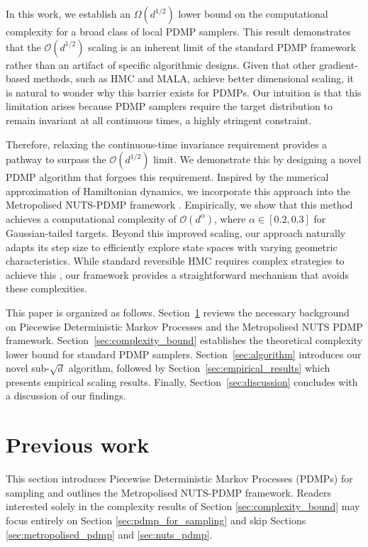 \documentclass{article}
\begin{document}
In this work, we establish an $\Omega(d^{1/2})$ lower bound on the computational complexity for a broad class of local PDMP samplers. This result demonstrates that the $\mathcal{O}(d^{1/2})$ scaling is an inherent limit of the standard PDMP framework rather than an artifact of specific algorithmic designs. Given that other gradient-based methods, such as HMC and MALA, achieve better dimensional scaling, it is natural to wonder why this barrier exists for PDMPs. Our intuition is that this limitation arises because PDMP samplers require the target distribution to remain invariant at all continuous times, a highly stringent constraint.

Therefore, relaxing the continuous-time invariance requirement provides a pathway to surpass the $\mathcal{O}(d^{1/2})$ limit. We demonstrate this by designing a novel PDMP algorithm that forgoes this requirement. Inspired by the numerical approximation of Hamiltonian dynamics, we incorporate this approach into the Metropolised NUTS-PDMP framework \cite{chevallier2025practicalpdmpsamplingmetropolis}.
Empirically, we show that this method achieves a computational complexity of $\mathcal{O}(d^\alpha)$, where $\alpha \in [0.2, 0.3]$ for Gaussian-tailed targets. Beyond this improved scaling, our approach naturally adapts its step size to efficiently explore state spaces with varying geometric characteristics. While standard reversible HMC requires complex strategies to achieve this \cite{bourabee2025gistgibbsselftuninglocally, bou2024incorporating,Modi2024,modi2024atlas, turok2024sampling,bourabee2025withinorbitadaptiveleapfrognouturn}, our framework provides a straightforward mechanism that avoids these complexities.


This paper is organized as follows. Section~\ref{sec:previous_work} reviews the necessary background on Piecewise Deterministic Markov Processes and the Metropolised NUTS PDMP framework. Section~\ref{sec:complexity_bound} establishes the theoretical complexity lower bound for standard PDMP samplers. Section~\ref{sec:algorithm} introduces our novel sub-$\sqrt{d}$ algorithm, followed by Section~\ref{sec:empirical_results} which presents empirical scaling results. Finally, Section~\ref{sec:discussion} concludes with a discussion of our findings.
\section{Previous work}
\label{sec:previous_work}

This section introduces Piecewise Deterministic Markov Processes (PDMPs) for sampling and outlines the Metropolised NUTS-PDMP framework. Readers interested solely in the complexity results of Section \ref{sec:complexity_bound} may focus entirely on Section \ref{sec:pdmp_for_sampling} and skip Sections \ref{sec:metropolised_pdmp} and \ref{sec:nuts_pdmp}.
\end{document}

